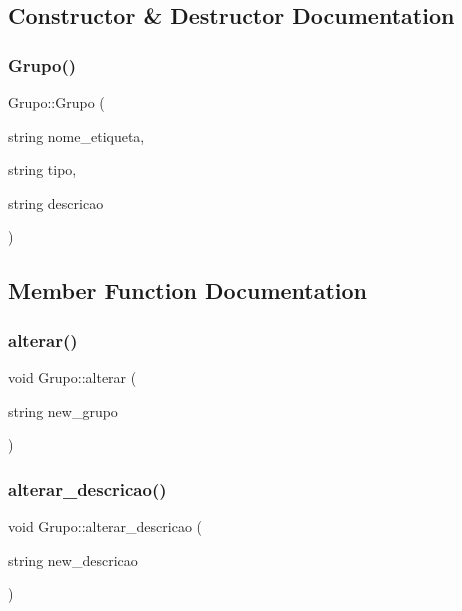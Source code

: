 \subsection{Constructor \& Destructor Documentation}
\mbox{\label{classGrupo_a14745ea67ff25543b2cf949f765a726b}} 
\subsubsection{\texorpdfstring{Grupo()}{Grupo()}}
{\footnotesize\ttfamily Grupo\+::\+Grupo (\begin{DoxyParamCaption}\item[{string}]{nome\+\_\+etiqueta,  }\item[{string}]{tipo,  }\item[{string}]{descricao }\end{DoxyParamCaption})}



\subsection{Member Function Documentation}
\mbox{\label{classGrupo_ad89de5bdcf8aa7913bb9d3cabe16aba1}} 
\subsubsection{\texorpdfstring{alterar()}{alterar()}}
{\footnotesize\ttfamily void Grupo\+::alterar (\begin{DoxyParamCaption}\item[{string}]{new\+\_\+grupo }\end{DoxyParamCaption})}

\mbox{\label{classGrupo_a307ca8081150b1c9784d22ff1d3d72d2}} 
\subsubsection{\texorpdfstring{alterar\+\_\+descricao()}{alterar\_descricao()}}
{\footnotesize\ttfamily void Grupo\+::alterar\+\_\+descricao (\begin{DoxyParamCaption}\item[{string}]{new\+\_\+descricao }\end{DoxyParamCaption})}

